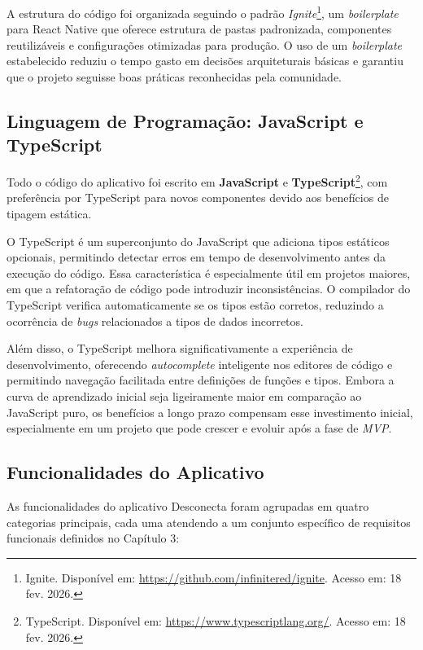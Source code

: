 A estrutura do código foi organizada seguindo o padrão \textit{Ignite}\footnote{Ignite. Disponível em: \url{https://github.com/infinitered/ignite}. Acesso em: 18 fev. 2026.}, um \textit{boilerplate} para React Native que oferece estrutura de pastas padronizada, componentes reutilizáveis e configurações otimizadas para produção. O uso de um \textit{boilerplate} estabelecido reduziu o tempo gasto em decisões arquiteturais básicas e garantiu que o projeto seguisse boas práticas reconhecidas pela comunidade.

\subsection{Linguagem de Programação: JavaScript e TypeScript}

Todo o código do aplicativo foi escrito em \textbf{JavaScript} e \textbf{TypeScript}\footnote{TypeScript. Disponível em: \url{https://www.typescriptlang.org/}. Acesso em: 18 fev. 2026.}, com preferência por TypeScript para novos componentes devido aos benefícios de tipagem estática.

O TypeScript é um superconjunto do JavaScript que adiciona tipos estáticos opcionais, permitindo detectar erros em tempo de desenvolvimento antes da execução do código. Essa característica é especialmente útil em projetos maiores, em que a refatoração de código pode introduzir inconsistências. O compilador do TypeScript verifica automaticamente se os tipos estão corretos, reduzindo a ocorrência de \textit{bugs} relacionados a tipos de dados incorretos.

Além disso, o TypeScript melhora significativamente a experiência de desenvolvimento, oferecendo \textit{autocomplete} inteligente nos editores de código e permitindo navegação fa\-ci\-li\-ta\-da entre definições de funções e tipos. Embora a curva de aprendizado inicial seja ligeiramente maior em comparação ao JavaScript puro, os benefícios a longo prazo compensam esse investimento inicial, especialmente em um projeto que pode crescer e evoluir após a fase de \textit{MVP}.

\subsection{Funcionalidades do Aplicativo}

As funcionalidades do aplicativo Desconecta foram agrupadas em quatro categorias principais, cada uma atendendo a um conjunto específico de requisitos funcionais definidos no Capítulo 3:


